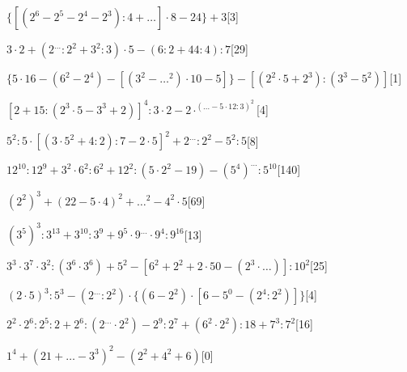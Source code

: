 \begin{esercizio} \label{ese:1.17}
$\{[(2^6-2^5-2^4-2^3):4+{\dots}]\cdot8-24\}+3$\hfill[3]
\end{esercizio}
\begin{esercizio} \label{ese:1.17}
$3\cdot2+(2^{\dots}:2^2+3^2:3)\cdot5-(6:2+44:4):7$\hfill[29]
\end{esercizio}
\begin{esercizio} \label{ese:1.17}
$\{5\cdot16-(6^2-2^4)-[(3^2-{\dots}^2)\cdot10-5]\}-[(2^2\cdot5+2^3):(3^3-5^2)]$\hfill[1]
\end{esercizio}
\begin{esercizio} \label{ese:1.17}
$[2+15:(2^3\cdot5-3^3+2)]^4:3\cdot2-2\cdot^({\dots}-5\cdot12:3)^2$\hfill[4]
\end{esercizio}
\begin{esercizio} \label{ese:1.17}
$5^2:5\cdot[(3\cdot5^2+4:2):7-2\cdot5]^2+2^{\dots}:2^2-5^2:5$\hfill[8]
\end{esercizio}
\begin{esercizio} \label{ese:1.17}
$12^{10}:12^9+3^2\cdot6^2:6^2+12^2:(5\cdot2^2-19)-(5^4)^{\dots}:5^{10}$\hfill[140]
\end{esercizio}
\begin{esercizio} \label{ese:1.17}
$(2^2)^3+(22-5\cdot4)^2+{\dots}^2-4^2\cdot5$\hfill[69]
\end{esercizio}
\begin{esercizio} \label{ese:1.17}
$(3^5)^3:3^{13}+3^{10}:3^9+9^5\cdot9^{\dots}\cdot9^4:9^{16}$\hfill[13]
\end{esercizio}
\begin{esercizio} \label{ese:1.17}
$3^3\cdot3^7\cdot3^2:(3^6\cdot3^6)+5^2-[6^2+2^2+2\cdot50-(2^3\cdot{\dots})]:10^2$\hfill[25]
\end{esercizio}
\begin{esercizio} \label{ese:1.17}
$(2\cdot5)^3:5^3-(2^{\dots}:2^2)\cdot\{(6-2^2)\cdot[6-5^0-(2^4:2^2)]\}$\hfill[4]
\end{esercizio}
\begin{esercizio} \label{ese:1.17}
$2^2\cdot2^6:2^5:2+2^6:(2^{\dots}\cdot2^2)-2^9:2^7+(6^2\cdot2^2):18+7^3:7^2$\hfill[16]
\end{esercizio}
\begin{esercizio} \label{ese:1.17}
$1^4+(21+{\dots}-3^3)^2-(2^2+4^2+6)$\hfill[0]
\end{esercizio}
